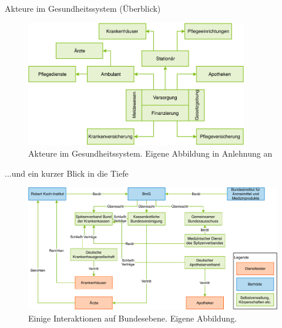 \documentclass[aspectratio=169,t]{beamer}
\begin{document}
\begin{frame}{Akteure im Gesundheitssystem (Überblick)}
    \begin{figure}[h!]
        \includegraphics[height=5.5cm]{Bilder/Gesundheitssystem.pdf}
        \caption{Akteure im Gesundheitssystem. Eigene Abbildung in Anlehnung an \cite{SmartHealth}}
    \end{figure}
\end{frame}

\begin{frame}{...und ein kurzer Blick in die Tiefe}
    \begin{figure}[h!]
        \includegraphics[height=5.5cm, right]{Bilder/GesundheitssystemAkteureBund.pdf}
        \caption{Einige Interaktionen auf Bundesebene. Eigene Abbildung.}
    \end{figure}
\end{frame}
\end{document}
